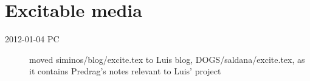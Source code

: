 
\chapter{Excitable media}
\label{c-excite}


\begin{description}

\item[2012-01-04 PC] moved siminos/blog/excite.tex to Luis blog,
DOGS/saldana/excite.tex, as it contains Predrag's notes relevant to Luis' project

\end{description}
